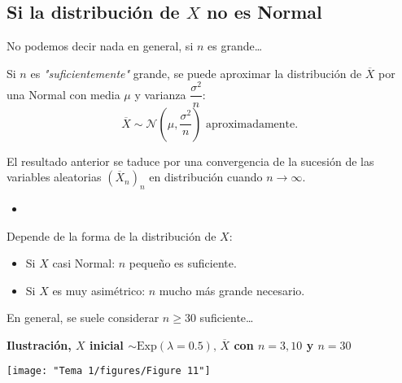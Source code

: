 \subsection{Si la distribución de $X$ no es Normal}
No podemos decir nada en general,  si $n$ es grande\dots
\begin{tcolorbox}[colback=blue!5!white, colframe=blue!75!black, title=\textbf{Teorema Central del Límite}]
  Si $n$ es \textit{"suficientemente"} grande, se puede aproximar la distribución de $\overline{X}$ por una Normal con media  $\mu$ y varianza $\dfrac{\sigma^2}{n}$: \[
    \overline{X}\sim \mathcal{N}\left( \mu,\dfrac{\sigma^2}{n} \right) \text{ aproximadamente. }
  \]  
\end{tcolorbox}
\begin{tcolorbox}[colback=blue!5!white, colframe=blue!75!black, title=\textbf{Formulación matemática}]
  El resultado anterior se taduce por una convergencia de la sucesión de las variables aleatorias $\left( \overline{X}_n \right)_n $ en distribución cuando $n\to \infty$.
\end{tcolorbox}
\begin{itemize}[label=\color{red}\textbullet, leftmargin=*]
  \item {}
\end{itemize}
Depende de la forma de la distribución de $X$:
 \begin{itemize}[label=\textbullet]
  \item Si $X$ casi Normal: $n$ pequeño es suficiente.
  \item Si $X$ es muy asimétrico: $n$ mucho más grande necesario.
\end{itemize}
En general, se suele considerar $n\ge 30$ suficiente\dots

\textbf{Ilustración, $X$ inicial $\sim \mathrm{Exp}(\lambda=0.5),\,\overline{X}$ con $n=3,10$ y  $n=30$}
\begin{center}
  \texttt{[image: "Tema 1/figures/Figure 11"]}
\end{center}
